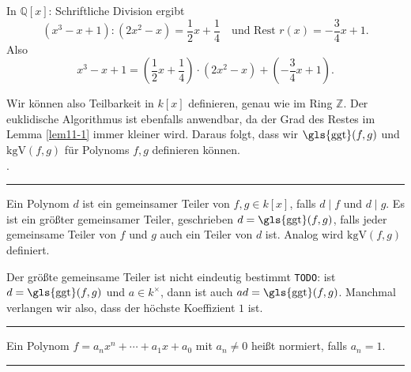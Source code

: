 \documentclass[9pt]{article}
\begin{document}
\begin{bsp}
In $\mathbb{Q}[x]$: Schriftliche Division ergibt  
\[
(x^3 - x + 1) : (2x^2 - x) = \frac{1}{2}x + \frac{1}{4} \quad \text{und Rest } r(x) = -\frac{3}{4}x + 1.
\]
Also  
\[
x^3 - x + 1 = \left(\frac{1}{2}x + \frac{1}{4}\right) \cdot (2x^2 - x) + \left(-\frac{3}{4}x + 1\right).
\]
\txc{
\[
f(x) = \left(Quotient\ 1 + Quotient\ 2\right) \cdot g(x) + \left(Rest\right)
\]
}

Wir können also Teilbarkeit in $k[x]$ definieren, genau wie im Ring $\mathbb{Z}$. Der euklidische Algorithmus ist ebenfalls anwendbar, da der Grad des Restes im Lemma \ref{lem11-1} immer kleiner wird. Daraus folgt, dass wir $\text{\gls{ggt}}(f, g)$ und $\text{kgV}(f, g)$ für \glspl{Polynom} $f, g$ definieren können. \\ . 
\end{bsp} \noindent \rule{8cm}{0.4pt}

\begin{defi}
Ein \gls{Polynom} $d$ ist ein gemeinsamer Teiler von $f, g \in k[x]$, falls $d \mid f$ und $d \mid g$. Es ist ein größter gemeinsamer Teiler, geschrieben $d = \text{\gls{ggt}}(f, g)$, falls jeder gemeinsame Teiler von $f$ und $g$ auch ein Teiler von $d$ ist.  
Analog wird $\text{kgV}(f, g)$ definiert.  

Der größte gemeinsame Teiler ist nicht eindeutig bestimmt \texttt{TODO}: ist $d = \text{\gls{ggt}}(f, g)$ und $a \in k^\times$, dann ist auch $ad = \text{\gls{ggt}}(f, g)$. Manchmal verlangen wir also, dass der höchste \gls{Koeffizient}  $1$ ist.  
\end{defi} \noindent \rule{8cm}{0.4pt}

\begin{defi}
Ein \gls{Polynom} $f = a_nx^n + \cdots + a_1x + a_0$ mit $a_n \neq 0$ heißt normiert, falls $a_n = 1$. 
\end{defi} \noindent \rule{8cm}{0.4pt}
\end{document}
